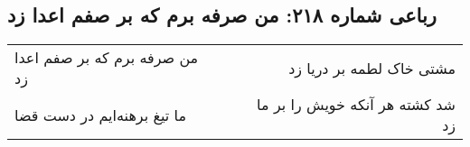\begin{center}
\section*{رباعی شماره ۲۱۸: من صرفه برم که بر صفم اعدا زد}
\label{sec:sh218}
\begin{longtable}{l p{0.5cm} r}
من صرفه برم که بر صفم اعدا زد
&&
مشتی خاک لطمه بر دریا زد
\\
ما تیغ برهنه‌ایم در دست قضا
&&
شد کشته هر آنکه خویش را بر ما زد
\\
\end{longtable}
\end{center}
